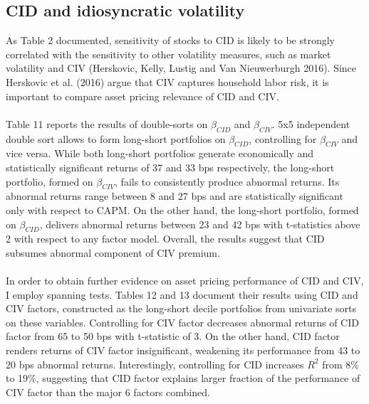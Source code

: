 \documentclass[12pt]{article}
\begin{document}
\subsection{CID and idiosyncratic volatility}
As Table 2 documented, sensitivity of stocks to CID is likely to be strongly correlated with the sensitivity to other volatility measures, such as market volatility and CIV (Herskovic, Kelly, Lustig and Van Nieuwerburgh 2016). Since Herskovic et al. (2016) argue that CIV captures household labor risk, it is important to compare asset pricing relevance of CID and CIV. 
\paragraph{}
Table 11 reports the results of double-sorts on $\beta_{CID}$ and $\beta_{CIV}$. 5x5 independent double sort allows to form long-short portfolios on $\beta_{CID}$, controlling for $\beta_{CIV}$ and vice versa. While both long-short portfolios generate economically and statistically significant returns of 37 and 33 bps respectively, the long-short portfolio, formed on $\beta_{CIV}$, fails to consistently produce abnormal returns. Its abnormal returns range between 8 and 27 bps and are statistically significant only with respect to CAPM. On the other hand, the long-short portfolio, formed on $\beta_{CID}$, delivers abnormal returns between 23 and 42 bps with t-statistics above 2 with respect to any factor model. Overall, the results suggest that CID subsumes abnormal component of CIV premium.
\paragraph{}
In order to obtain further evidence on asset pricing performance of CID and CIV, I employ spanning tests. Tables 12 and 13 document their results using CID and CIV factors, constructed as the long-short decile portfolios from univariate sorts on these variables. Controlling for CIV factor decreases abnormal returns of CID factor from 65 to 50 bps with t-statistic of 3. On the other hand, CID factor renders returns of CIV factor insignificant, weakening its performance from 43 to 20 bps abnormal returns. Interestingly, controlling for CID increases $R^2$ from 8\% to 19\%, suggesting that CID factor explains larger fraction of the performance of CIV factor than the major 6 factors combined. 
\end{document}
